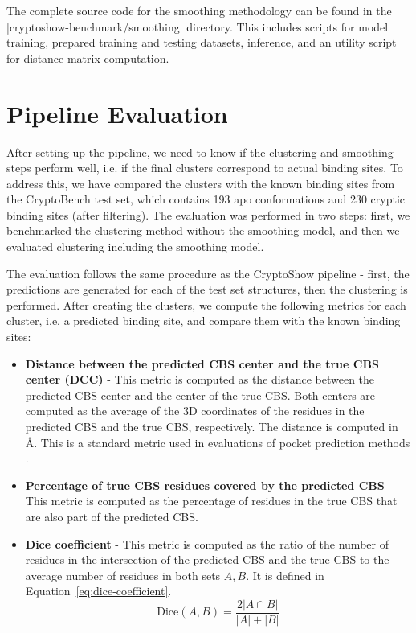 The complete source code for the smoothing methodology can be found in the \inline|cryptoshow-benchmark/smoothing| directory. This includes scripts for model training, prepared training and testing datasets, inference, and an utility script for distance matrix computation.

\section{Pipeline Evaluation}
\label{sec:pipeline-evaluation}

After setting up the pipeline, we need to know if the clustering and smoothing steps perform well, i.e. if the final clusters correspond to actual binding sites. To address this, we have compared the clusters with the known binding sites from the CryptoBench test set, which contains 193 apo conformations and 230 cryptic binding sites (after filtering). The evaluation was performed in two steps: first, we benchmarked the clustering method without the smoothing model, and then we evaluated clustering including the smoothing model.

The evaluation follows the same procedure as the CryptoShow pipeline - first, the predictions are generated for each of the test set structures, then the clustering is performed. After creating the clusters, we compute the following metrics for each cluster, i.e. a predicted binding site, and compare them with the known binding sites:

\begin{itemize}
    \item \textbf{Distance between the predicted CBS center and the true CBS center (DCC)} - This metric is computed as the distance between the predicted CBS center and the center of the true CBS. Both centers are computed as the average of the 3D coordinates of the residues in the predicted CBS and the true CBS, respectively. The distance is computed in \AA. This is a standard metric used in evaluations of pocket prediction methods \cite{kandel2021puresnet}.
    \item \textbf{Percentage of true CBS residues covered by the predicted CBS} - This metric is computed as the percentage of residues in the true CBS that are also part of the predicted CBS.
    \item \textbf{Dice coefficient} - This metric is computed as the ratio of the number of residues in the intersection of the predicted CBS and the true CBS to the average number of residues in both sets $A, B$. It is defined in Equation~\ref{eq:dice-coefficient}.
    \begin{equation}
        \text{Dice}(A, B) = \frac{2 |A \cap B|}{|A| + |B|}
        \label{eq:dice-coefficient}
    \end{equation}
\end{itemize}


